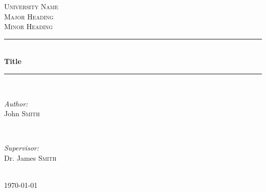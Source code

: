 \documentclass[12pt]{article} %
\begin{document}

\begin{titlepage}

  \newcommand{\HRule}{\rule{\linewidth}{0.5mm}} %

  \center %

  \textsc{\LARGE University Name}\\[1.5cm] %
  \textsc{\Large Major Heading}\\[0.5cm] %
  \textsc{\large Minor Heading}\\[0.5cm] %

  \HRule \\[0.4cm]
  { \huge \bfseries Title}\\[0.4cm] %
  \HRule \\[1.5cm]

  \begin{minipage}{0.4\textwidth}
    \begin{flushleft} \large
      \emph{Author:}\\
      John \textsc{Smith} %
    \end{flushleft}
  \end{minipage}
  ~
  \begin{minipage}{0.4\textwidth}
    \begin{flushright} \large
      \emph{Supervisor:} \\
      Dr. James \textsc{Smith} %
    \end{flushright}
  \end{minipage}\\[4cm]

  {\large \today}\\[3cm] %


  \vfill %

\end{titlepage}
\end{document}
